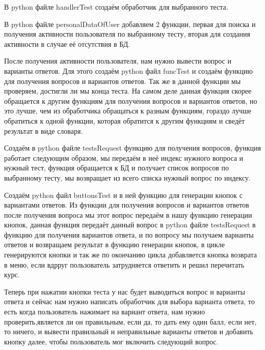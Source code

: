 \documentclass[12pt, oldlfont, amsfonts]{report}
\begin{document}
В python файле { handlerTest} создаём обработчик для выбранного теста.

В python файле { personalDataOfUser} добавляем 2 функции, первая для поиска и получения активности пользователя по выбранному тесту, вторая для создания активности в случае её отсутствия в БД.

После получения активности пользователя, нам нужно вывести вопрос и варианты ответов. Для этого создаём python файл { funcTest} и создаём функцию для получения вопросов и вариантов ответов. Так же в данной функции мы проверяем, достигли ли мы конца теста. На самом деле данная функция скорее обращается к другим функциям для получения вопросов и вариантов ответов, но это лучше, чем из обработчика обращаться к разным функциям, гораздо лучше обратиться к одной функции, которая обратится к другим функциям и сведёт результат в виде словаря. 

Создаём в python файле { testsRequest} функцию для получения вопросов, функция работает следующим образом, мы передаём в неё индекс нужного вопроса и нужный тест, функция обращается к БД и получает список вопросов по выбранному тесту, мы возвращает из всего списка нужный вопрос по индексу. 

Создаём python файл { buttonsTest} и в ней функцию для генерации кнопок с вариантами ответов. Из функции для получения вопросов и вариантов ответов после получения вопроса мы этот вопрос передаём в нашу функцию генерации кнопок, данная функция передаёт данный вопрос в python файле { testsRequest} в функцию для получения вариантов ответа, и по вопросу мы получаем варианты ответов и возвращаем результат в функцию генерации кнопок, в цикле генерируются кнопки и так же по окончанию цикла добавляется кнопка возврата в меню, если вдрруг пользователь затрудняется ответить и решил перечитать курс.

Теперь при нажатии кнопки теста у нас будет выводиться вопрос и варианты ответа и сейчас нам нужно написать обработчик для выбора варианта ответа, то есть когда пользователь нажимает на вариант ответа, нам нужно проверить,является ли он правильным, если да, то дать ему один балл, если нет, то ничего, и вывести правильный и неправильные варианты ответов и добавить кнопку далее, чтобы пользователь мог включить следующий вопрос. 
\end{document}
